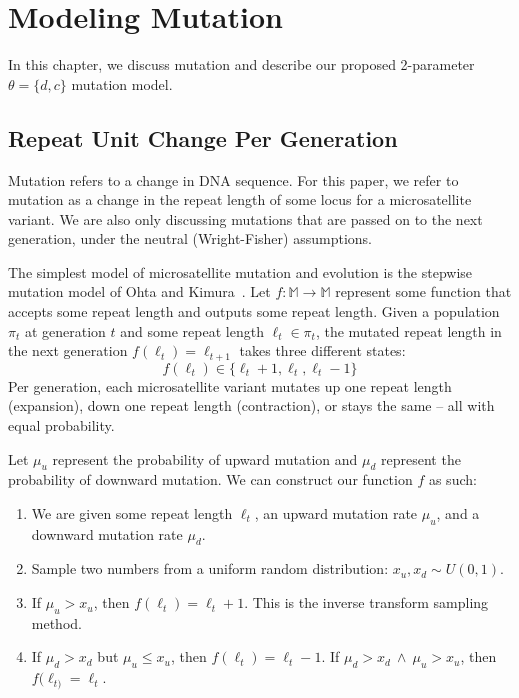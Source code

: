 \chapter{Modeling Mutation}\label{ch:modelingMutation}
In this chapter, we discuss mutation and describe our proposed 2-parameter $\theta = \{ d, c\}$ mutation model.

\section{Repeat Unit Change Per Generation}\label{sec:repeatUnitChangePerGeneration}
Mutation refers to a change in DNA sequence.
For this paper, we refer to mutation as a change in the repeat length of some locus for a microsatellite variant.
We are also only discussing mutations that are passed on to the next generation, under the neutral (Wright-Fisher)
assumptions.

The simplest model of microsatellite mutation and evolution is the stepwise mutation
model of Ohta and Kimura~\cite{ohtaModelMutationAppropriate2007}.
Let $f : \mathbb{M} \rightarrow \mathbb{M}$ represent some function that accepts some repeat length and outputs some
repeat length.
Given a population $\pi_t$ at generation $t$ and some repeat length $\ell_t \in \pi_t$, the mutated repeat length
in the next generation $f(\ell_{t}) = \ell_{t+1}$ takes three different states:
\begin{equation}
    f(\ell_t) \in \{ \ell_t + 1 , \ell_t, \ell_t - 1\}
\end{equation}
Per generation, each microsatellite variant mutates up one repeat length (expansion), down one repeat length
(contraction), or stays the same -- all with equal probability.

Let $\mu_u$ represent the probability of upward mutation and $\mu_d$ represent the probability of downward mutation.
We can construct our function $f$ as such:
\begin{enumerate}
    \item We are given some repeat length $\ell_t$, an upward mutation rate $\mu_u$, and a
        downward mutation rate $\mu_d$.
    \item Sample two numbers from a uniform random distribution: $x_u, x_d \sim U(0, 1)$.
    \item If $\mu_u > x_u$, then $f(\ell_{t}) = \ell_t + 1$.
        This is the inverse transform sampling method. \label{enum:um}
    \item If $\mu_d > x_d$ but $\mu_u \leq x_u$, then $f(\ell_{t}) = \ell_t - 1$. \label{enum:dm}
        If $\mu_d > x_d \ \land \ \mu_u > x_u$, then $f(\ell_{t)} = \ell_{t}$.
\end{enumerate}

